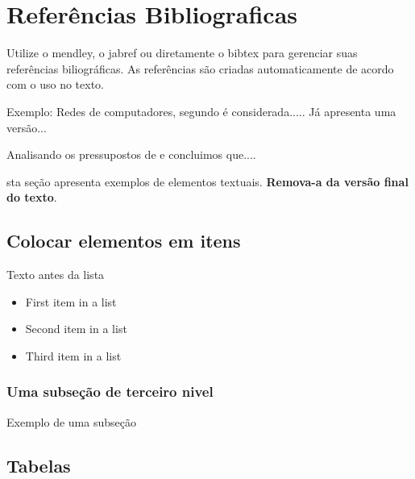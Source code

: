 \documentclass[	DIV=calc,%
							paper=a4,%
							fontsize=12pt,%
							onecolumn]{scrartcl}	 					%
\begin{document}
\clearpage
\section{Referências Bibliograficas}
\begingroup
\renewcommand{\section}[2]{}
Utilize o mendley, o jabref ou diretamente o bibtex para gerenciar suas referências biliográficas. As referências são criadas automaticamente de acordo com o uso no texto.

Exemplo: Redes de computadores, segundo \cite{scrumguide} é considerada..... Já \cite{leia77} apresenta uma versão...

Analisando os pressupostos de \cite{Buerger1989} e \cite{leia77} concluimos que....


 
\endgroup



\section{Elementos textuais - Alguns exemplos}

Esta seção apresenta exemplos de elementos textuais. \textbf{Remova-a da versão final do texto}.


\subsection{Colocar elementos em itens}

Texto antes da lista

\begin{itemize}
	\item First item in a list 
	\item Second item in a list 
	\item Third item in a list
\end{itemize}

\subsubsection{Uma subseção de terceiro nivel}

Exemplo de uma subseção

\subsection{Tabelas}
\end{document}
